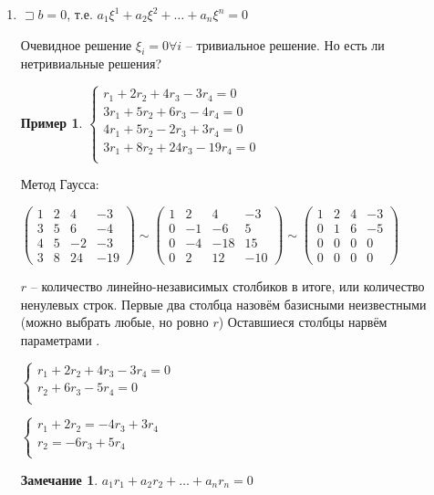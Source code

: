 \documentclass{book}
\theoremstyle{definition}
\newtheorem*{note}{Замечание}
\newtheorem*{example}{Пример}
\begin{document}
\begin{enumerate}
    \item $\sqsupset b = 0$, т.е. $a_1\xi^1 + a_2\xi^2 + \ldots + a_n\xi^n = 0$

        Очевидное решение $\xi_i=0 \forall i$ -- тривиальное решение. Но есть ли нетривиальные решения?

        \begin{example}

            $\begin{cases}
            r_1+2r_2+4r_3-3r_4=0\\
            3r_1+5r_2+6r_3-4r_4 = 0\\
            4r_1+5r_2-2r_3+3r_4 = 0\\
            3r_1+8r_2+24r_3-19r_4=0\\
            \end{cases}$

            Метод Гаусса:

            $\begin{pmatrix} 1&2&4&-3\\3&5&6&-4\\4&5&-2&-3\\3&8&24&-19 \end{pmatrix} \sim \begin{pmatrix} 1&2&4&-3\\0&-1&-6&5\\0&-4&-18&15\\0&2&12&-10 \end{pmatrix} \sim \begin{pmatrix} 1&2&4&-3\\0&1&6&-5\\0&0&0&0\\0&0&0&0 \end{pmatrix} $ 

            $r$ -- количество линейно-независимых столбиков в итоге, или количество ненулевых строк. Первые два столбца назовём базисными неизвестными (можно выбрать любые, но ровно $r$) Оставшиеся столбцы нарвём параметрами . 

            $\begin{cases}
                r_1+2r_2+4r_3-3r_4=0\\
                r_2+6r_3-5r_4=0\\
            \end{cases}$

            $\begin{cases}
                r_1+2r_2=-4r_3+3r_4\\
                r_2 = -6r_3+5r_4\\
            \end{cases}$
        \end{example}
        \begin{note}
            $a_1r_1+a_2r_2+\ldots +a_nr_n = 0$


\end{note}
\end{enumerate}
\end{document}
